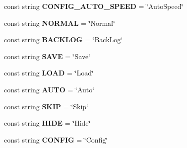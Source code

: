 \begin{DoxyCompactItemize}
\item 
const string {\bfseries C\+O\+N\+F\+I\+G\+\_\+\+A\+U\+T\+O\+\_\+\+S\+P\+E\+ED} = \char`\"{}Auto\+Speed\char`\"{}\hypertarget{classdoki_unity_1_1_game_constants_a8b82fc4c0dbb3e5ce4d053711dfcae96}{}\label{classdoki_unity_1_1_game_constants_a8b82fc4c0dbb3e5ce4d053711dfcae96}

\item 
const string {\bfseries N\+O\+R\+M\+AL} = \char`\"{}Normal\char`\"{}\hypertarget{classdoki_unity_1_1_game_constants_a63191389aeecea0e83848a05b7701d24}{}\label{classdoki_unity_1_1_game_constants_a63191389aeecea0e83848a05b7701d24}

\item 
const string {\bfseries B\+A\+C\+K\+L\+OG} = \char`\"{}Back\+Log\char`\"{}\hypertarget{classdoki_unity_1_1_game_constants_a4771876a8d0634e93cc2bad97cd43aad}{}\label{classdoki_unity_1_1_game_constants_a4771876a8d0634e93cc2bad97cd43aad}

\item 
const string {\bfseries S\+A\+VE} = \char`\"{}Save\char`\"{}\hypertarget{classdoki_unity_1_1_game_constants_a96de5b5f74e29b74ca409d12c4bd6797}{}\label{classdoki_unity_1_1_game_constants_a96de5b5f74e29b74ca409d12c4bd6797}

\item 
const string {\bfseries L\+O\+AD} = \char`\"{}Load\char`\"{}\hypertarget{classdoki_unity_1_1_game_constants_a7479098da57aac60fea5ced70a4be0e9}{}\label{classdoki_unity_1_1_game_constants_a7479098da57aac60fea5ced70a4be0e9}

\item 
const string {\bfseries A\+U\+TO} = \char`\"{}Auto\char`\"{}\hypertarget{classdoki_unity_1_1_game_constants_a179f726027eda81dd4382d74d2aa2ba7}{}\label{classdoki_unity_1_1_game_constants_a179f726027eda81dd4382d74d2aa2ba7}

\item 
const string {\bfseries S\+K\+IP} = \char`\"{}Skip\char`\"{}\hypertarget{classdoki_unity_1_1_game_constants_a534e1b8e58436a5792dfec65b383cb05}{}\label{classdoki_unity_1_1_game_constants_a534e1b8e58436a5792dfec65b383cb05}

\item 
const string {\bfseries H\+I\+DE} = \char`\"{}Hide\char`\"{}\hypertarget{classdoki_unity_1_1_game_constants_a6432b86c4a4556c863d045f7e73ad9f2}{}\label{classdoki_unity_1_1_game_constants_a6432b86c4a4556c863d045f7e73ad9f2}

\item 
const string {\bfseries C\+O\+N\+F\+IG} = \char`\"{}Config\char`\"{}\hypertarget{classdoki_unity_1_1_game_constants_a037c2b946aae5c761faeccc040db7f13}{}\label{classdoki_unity_1_1_game_constants_a037c2b946aae5c761faeccc040db7f13}


\end{DoxyCompactItemize}
